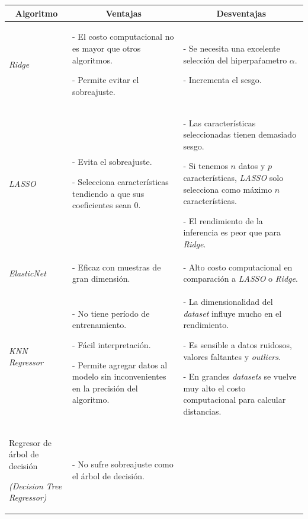 \documentclass[a4paper,12pt]{article}
\begin{document}
\begin{landscape}

	\setcounter{page}{15}
		
	\begin{table}[]
		\centering
		\begin{tabularx}{\hsize}{|X|X|X|}
			\hline
			\multicolumn{1}{|c|}{\textbf{Algoritmo}} & \multicolumn{1}{|c|}{\textbf{Ventajas}} & \multicolumn{1}{|c|}{\textbf{Desventajas}} \\
			\hline
			\textit{Ridge}   & 
			- El costo computacional no es mayor que otros algoritmos.
						
			- Permite evitar el sobreajuste. & 
			- Se necesita una excelente selección del hiperpaŕametro $\alpha$. 
						
			- Incrementa el sesgo.
			\\ \hline
			\textit{LASSO}      & 
			- Evita el sobreajuste. 
						
			- Selecciona características tendiendo a que sus coeficientes sean 0. & 
			- Las características seleccionadas tienen demasiado sesgo. 
						
			- Si tenemos $n$ datos y $p$ características, \textit{LASSO} solo selecciona como máximo $n$ características. 
						
			- El rendimiento de la inferencia es peor que para \textit{Ridge}.
						
			\\ \hline
			\textit{ElasticNet}           & 
			- Eficaz con muestras de gran dimensión.
			& 
			- Alto costo computacional en comparación a \textit{LASSO} o \textit{Ridge}.
			\\ \hline
			\textit{KNN Regressor} & 
			- No tiene período de entrenamiento.
						
			- Fácil interpretación.
						
			- Permite agregar datos al modelo sin inconvenientes en la precisión del algoritmo.
			&
			- La dimensionalidad del \textit{dataset} influye mucho en el rendimiento.
						
			- Es sensible a datos ruidosos, valores faltantes y \textit{outliers}.
						
			- En grandes \textit{datasets} se vuelve muy alto el costo computacional para calcular distancias.			
						
			\\ \hline
			Regresor de árbol de decisión
						
			\textit{(Decision Tree Regressor)} & 
			- No sufre sobreajuste como el árbol de decisión.
						

\end{tabularx}
\end{table}
\end{landscape}
\end{document}
